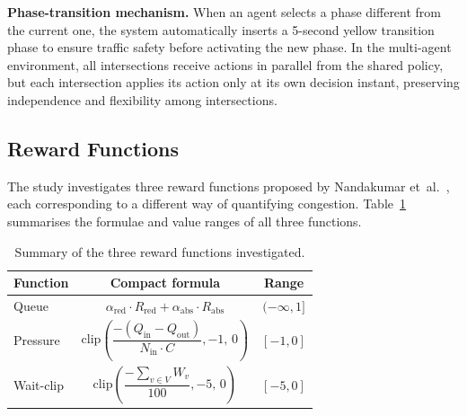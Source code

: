 \noindent\textbf{Phase-transition mechanism.}\;
When an agent selects a phase different from the current one, the system
automatically inserts a 5-second yellow transition phase to ensure traffic
safety before activating the new phase. In the multi-agent environment, all
intersections receive actions in parallel from the shared policy, but each
intersection applies its action only at its own decision instant, preserving
independence and flexibility among intersections.

\subsection{Reward Functions}

The study investigates three reward functions proposed by Nandakumar
et~al.~\cite{nandakumar2025}, each corresponding to a different way of
quantifying congestion. Table~\ref{tab:rewards} summarises the formulae and
value ranges of all three functions.

\begin{table}[htbp]
    \caption{Summary of the three reward functions investigated.}
    \label{tab:rewards}
    \centering
    \begin{tabular}{lcc}
        \toprule
        \textbf{Function} & \textbf{Compact formula} & \textbf{Range} \\
        \midrule
        Queue &
            $\alpha_\mathrm{red}\cdot R_\mathrm{red}
             + \alpha_\mathrm{abs}\cdot R_\mathrm{abs}$ &
            $(-\infty, 1]$ \\
        Pressure &
            $\mathrm{clip}\!\left(
              \dfrac{-(Q_\mathrm{in}-Q_\mathrm{out})}{N_\mathrm{in}\cdot C},
              -1,\, 0\right)$ &
            $[-1, 0]$ \\
        Wait-clip &
            $\mathrm{clip}\!\left(
              \dfrac{-\sum_{v\in V} W_v}{100},
              -5,\, 0\right)$ &
            $[-5, 0]$ \\
        \bottomrule
    \end{tabular}
\end{table}

